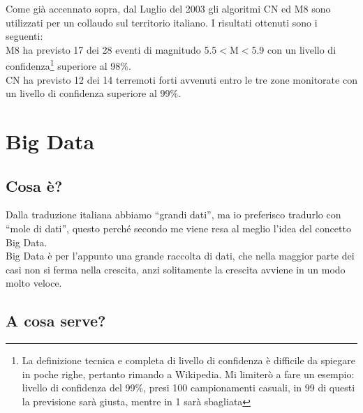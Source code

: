 Come gi\`a accennato sopra, dal Luglio del 2003 gli algoritmi CN ed M8 sono utilizzati per un collaudo sul territorio italiano. I risultati ottenuti sono i seguenti:\\
M8 ha previsto 17 dei 28 eventi di magnitudo 5.5$<$M$<$5.9 con un livello di confidenza\footnote{La definizione tecnica e completa di livello di confidenza \`e difficile da spiegare in poche righe, pertanto rimando a Wikipedia. Mi limiter\`o a fare un esempio: livello di confidenza del 99\%, presi 100 campionamenti casuali, in 99 di questi la previsione sar\`a giusta, mentre in 1 sar\`a sbagliata} superiore al 98\%.\\
CN ha previsto 12 dei 14 terremoti forti avvenuti entro le tre zone monitorate con un livello di confidenza superiore al 99\%. \cite{GiulianoFPanza}

\section{Big Data}\label{bigData}

\subsection{Cosa \`e?}
Dalla traduzione italiana abbiamo ``grandi dati'', ma io preferisco tradurlo con ``mole di dati'', questo perch\'e secondo me viene resa al meglio l'idea del concetto Big Data.\\
Big Data \`e per l'appunto una grande raccolta di dati, che nella maggior parte dei casi non si ferma nella crescita, anzi solitamente la crescita avviene in un modo molto veloce.

\subsection{A cosa serve?}\label{aCosaServono}

